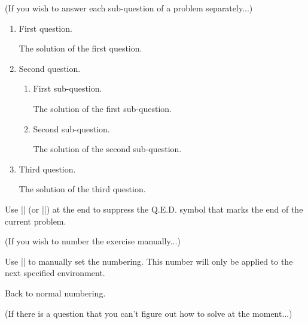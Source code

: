 \documentclass[11pt,
  logo = {example-image},
  title in boldface,
  theorem in new line,
  simple names,
  colored solution,
]{homework}
\begin{document}
\bigskip\textcolor{gray!55}{(If you wish to answer each sub-question of a problem separately...)}

\begin{problem}
    \begin{enumerate}
        \item First question.

        \begin{solution}
            The solution of the first question.
        \end{solution}

        \item Second question.

        \begin{enumerate}
            \item First sub-question.

            \begin{solution}
                The solution of the first sub-question.
            \end{solution}

            \item Second sub-question.

            \begin{solution}
                The solution of the second sub-question.
            \end{solution}

        \end{enumerate}

        \item Third question.

        \begin{solution}
            The solution of the third question.
        \end{solution}

    \end{enumerate}
    Use \cverb|\noqed| (or \cverb|\noQED|) at the end to suppress the Q.E.D. symbol that marks the end of the current problem.
    \noQED
\end{problem}


\bigskip\textcolor{gray!55}{(If you wish to number the exercise manually...)}

\begin{exercise}
    Use \cverb|\ManualNumbering| to manually set the numbering. This number will only be applied to the next specified environment.
\end{exercise}

\begin{exercise}
    Back to normal numbering.
\end{exercise}


\bigskip\textcolor{gray!55}{(If there is a question that you can't figure out how to solve at the moment...)}

\end{document}
